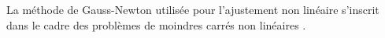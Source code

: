 \documentclass[a4paper,12pt]{article}
\begin{document}
La méthode de Gauss-Newton utilisée pour l'ajustement non linéaire s'inscrit dans le cadre des problèmes de moindres carrés non linéaires \cite{bjorck1996}.







%
%
%
%
%
%
%
\end{document}
